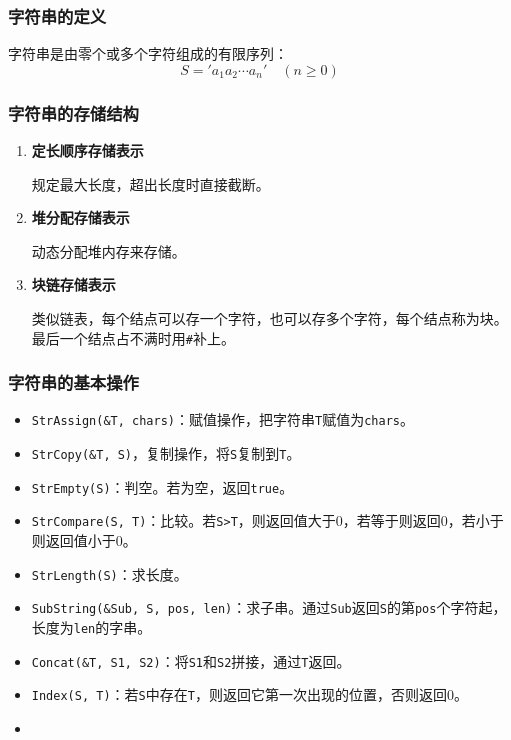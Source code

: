 \documentclass[12pt, a4paper, oneside]{ctexart}
\begin{document}
\subsubsection{字符串的定义}

字符串是由零个或多个字符组成的有限序列：
\begin{equation*}
  S='a_1 a_2 \cdots a_n'\quad (n\geq 0)
\end{equation*}

\subsubsection{字符串的存储结构}

\begin{enumerate}
  \item {\bf 定长顺序存储表示}
  
  规定最大长度，超出长度时直接截断。

  \item {\bf 堆分配存储表示}
  
  动态分配堆内存来存储。

  \item {\bf 块链存储表示}
  
  类似链表，每个结点可以存一个字符，也可以存多个字符，每个结点称为块。最后一个结点占不满时用\verb|#|补上。
\end{enumerate}

\subsubsection{字符串的基本操作}

\begin{itemize}
  \item \verb|StrAssign(&T, chars)|：赋值操作，把字符串\verb|T|赋值为\verb|chars|。
  \item \verb|StrCopy(&T, S)|，复制操作，将\verb|S|复制到\verb|T|。
  \item \verb|StrEmpty(S)|：判空。若为空，返回\verb|true|。
  \item \verb|StrCompare(S, T)|：比较。若\verb|S>T|，则返回值大于0，若等于则返回0，若小于则返回值小于0。
  \item \verb|StrLength(S)|：求长度。
  \item \verb|SubString(&Sub, S, pos, len)|：求子串。通过\verb|Sub|返回\verb|S|的第\verb|pos|个字符起，长度为\verb|len|的字串。
  \item \verb|Concat(&T, S1, S2)|：将\verb|S1|和\verb|S2|拼接，通过\verb|T|返回。
  \item \verb|Index(S, T)|：若\verb|S|中存在\verb|T|，则返回它第一次出现的位置，否则返回0。
  \item \verb||
\end{itemize}
\end{document}
